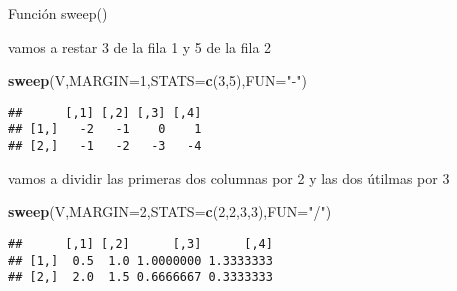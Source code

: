\documentclass[ignorenonframetext,]{beamer}
\newenvironment{Shaded}{\begin{snugshade}}{\end{snugshade}}
\newcommand{\KeywordTok}[1]{\textcolor[rgb]{0.13,0.29,0.53}{\textbf{#1}}}
\newcommand{\DataTypeTok}[1]{\textcolor[rgb]{0.13,0.29,0.53}{#1}}
\newcommand{\DecValTok}[1]{\textcolor[rgb]{0.00,0.00,0.81}{#1}}
\newcommand{\StringTok}[1]{\textcolor[rgb]{0.31,0.60,0.02}{#1}}
\newcommand{\NormalTok}[1]{#1}
\begin{document}
\begin{frame}[fragile]{Función sweep()}

vamos a restar 3 de la fila 1 y 5 de la fila 2

\begin{Shaded}
\begin{Highlighting}[]
\KeywordTok{sweep}\NormalTok{(V,}\DataTypeTok{MARGIN=}\DecValTok{1}\NormalTok{,}\DataTypeTok{STATS=}\KeywordTok{c}\NormalTok{(}\DecValTok{3}\NormalTok{,}\DecValTok{5}\NormalTok{),}\DataTypeTok{FUN=}\StringTok{"-"}\NormalTok{)}
\end{Highlighting}
\end{Shaded}

\begin{verbatim}
##      [,1] [,2] [,3] [,4]
## [1,]   -2   -1    0    1
## [2,]   -1   -2   -3   -4
\end{verbatim}

vamos a dividir las primeras dos columnas por 2 y las dos útilmas por 3

\begin{Shaded}
\begin{Highlighting}[]
\KeywordTok{sweep}\NormalTok{(V,}\DataTypeTok{MARGIN=}\DecValTok{2}\NormalTok{,}\DataTypeTok{STATS=}\KeywordTok{c}\NormalTok{(}\DecValTok{2}\NormalTok{,}\DecValTok{2}\NormalTok{,}\DecValTok{3}\NormalTok{,}\DecValTok{3}\NormalTok{),}\DataTypeTok{FUN=}\StringTok{"/"}\NormalTok{)}
\end{Highlighting}
\end{Shaded}

\begin{verbatim}
##      [,1] [,2]      [,3]      [,4]
## [1,]  0.5  1.0 1.0000000 1.3333333
## [2,]  2.0  1.5 0.6666667 0.3333333
\end{verbatim}

\end{frame}
\end{document}
